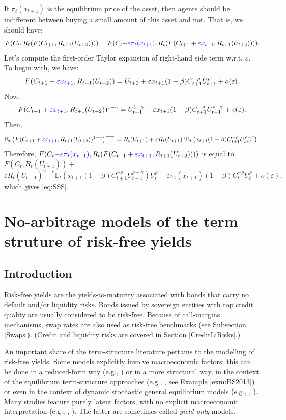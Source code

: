 \documentclass[
  12pt,
]{book}
\theoremstyle{definition}
\theoremstyle{definition}
\theoremstyle{definition}
\theoremstyle{definition}
\theoremstyle{remark}
\begin{document}
If \(\pi_t(x_{t+1})\) is the equilibrium price of the asset, then agents should be indifferent between buying a small amount of this asset and not. That is, we should have:
\[
F(C_t,R_t(F(C_{t+1},R_{t+1}(U_{t+2})))) =
F(C_t {\color{blue} - \varepsilon \pi_t(x_{t+1})},R_t(F(C_{t+1}+{\color{blue}\varepsilon x_{t+1}},R_{t+1}(U_{t+2})))).
\]
Let's compute the first-order Taylor expansion of right-hand side term w.r.t. \(\varepsilon\). To begin with, we have:
\[
F(C_{t+1}+{\color{blue}\varepsilon x_{t+1}},R_{t+1}(U_{t+2})) = U_{t+1} + \varepsilon x_{t+1} (1-\beta) C_{t+1}^{-\rho}U_{t+1}^\rho + o(\varepsilon).
\]
Now,
\[
F(C_{t+1}+{\color{blue}\varepsilon x_{t+1}},R_{t+1}(U_{t+2}))^{1-\gamma} = U_{t+1}^{1-\gamma} + \varepsilon x_{t+1}  (1-\beta) C_{t+1}^{-\rho}U_{t+1}^{\rho-\gamma} + o(\varepsilon).
\]
Then,
\[
\mathbb{E}_t \left( F(C_{t+1}+{\color{blue}\varepsilon x_{t+1}},R_{t+1}(U_{t+2}))^{1-\gamma} \right)^{\frac{1}{1-\gamma}}=R_t(U_{t+1}) + \varepsilon R_t(U_{t+1})^{\gamma} \mathbb{E}_t \left(  x_{t+1} (1-\beta) C_{t+1}^{-\rho} U_{t+1}^{\rho-\gamma} \right).
\]
Therefore, \(F(C_t{\color{blue} - \varepsilon \pi_t(x_{t+1})},R_t(F(C_{t+1}+{\color{blue}\varepsilon x_{t+1}},R_{t+1}(U_{t+2}))))\) is equal to \(F(C_t,R_t(U_{t+1}))+\)
\[
\varepsilon R_t(U_{t+1})^{\gamma - \rho} \mathbb{E}_t \left(  x_{t+1} (1-\beta) C_{t+1}^{-\rho} U_{t+1}^{\rho-\gamma} \right) U_t^{\rho}
- \varepsilon \pi_t(x_{t+1}) (1-\beta) C_t^{-\rho} U_t^{\rho} + o(\varepsilon),
\]
which gives \eqref{eq:SSS}.

\hypertarget{TSModels}{%
\chapter{No-arbitrage models of the term struture of risk-free yields}\label{TSModels}}

\hypertarget{RFIntroduction}{%
\section{Introduction}\label{RFIntroduction}}

Risk-free yields are the yields-to-maturity associated with bonds that carry no default and/or liquidity risks. Bonds issued by sovereign entities with top credit quality are usually considered to be risk-free. Because of call-margins mechanisms, swap rates are also used as risk-free benchmarks \citep{Duffie_Stein_2015} (see Subsection \ref{Swaps}). (Credit and liquidity risks are covered in Section \ref{CreditLiRisks}.)

An important share of the term-structure literature pertains to the modelling of risk-free yields. Some models explicitly involve macroeconomic factors; this can be done in a reduced-form way (e.g., \citet{Ang_Piazzesi_2003}) or in a more structural way, in the context of the equilibrium term-structure approaches (e.g., \citet{Bansal_Shaliastovich_2013}, see Example \ref{exm:BS2013}) or even in the context of dynamic stochastic general equilibrium models (e.g., \citet{Hordahl_Tristani_veston_2008}, \citet{DewBecker_2014}). Many studies feature purely latent factors, with no explicit macroeconomic interpretation (e.g., \citet{Duffie_Singleton_1997}, \citet{Joslin_Singleton_Zhu_2011}). The latter are sometimes called \emph{yield-only} models.
\end{document}
